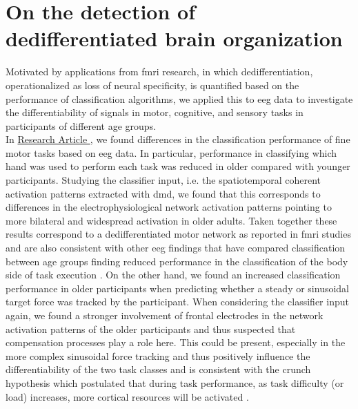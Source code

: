 \section{On the detection of dedifferentiated brain organization}
Motivated by applications from \gls{fmri} research, in which dedifferentiation, operationalized as loss of neural specificity, is quantified based on the performance of classification algorithms, we applied this to \gls{eeg} data to investigate the differentiability of signals in motor, cognitive, and sensory tasks in participants of different age groups.\\
In \hyperref[results:paperI]{Research Article }, we found differences in the classification performance of fine motor tasks based on \gls{eeg} data. In particular, performance in classifying which hand was used to perform each task was reduced in older compared with younger participants. Studying the classifier input, i.e. the spatiotemporal coherent activation patterns extracted with \gls{dmd}, we found that this corresponds to differences in the electrophysiological network activation patterns pointing to more bilateral and widespread activation in older adults. Taken together these results correspond to a dedifferentiated motor network as reported in \gls{fmri} studies \cite{Carb2011,Cassedy2020} and are also consistent with other \gls{eeg} findings that have compared classification between age groups finding reduced performance in the classification of the body side of task execution \cite{Chen2019, Zich2015}. On the other hand, we found an increased classification performance in older participants when predicting whether a steady or sinusoidal target force was tracked by the participant. When considering the classifier input again, we found a stronger involvement of frontal electrodes in the network activation patterns of the older participants and thus suspected that compensation processes play a role here. This could be present,  especially in the more complex sinusoidal force tracking and thus positively influence the differentiability of the two task classes and is consistent with the \gls{crunch} hypothesis which  postulated that during task performance, as task difficulty (or load) increases, more cortical resources will be activated \cite{Festini2018}.\\ 
